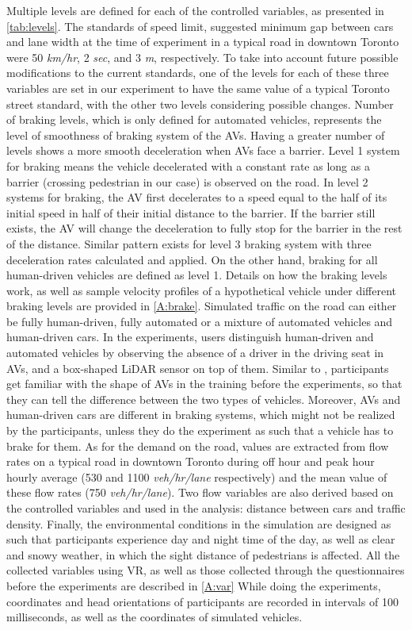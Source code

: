 Multiple levels are defined for each of the controlled variables, as presented in \cref{tab:levels}. The standards of speed limit, suggested minimum gap between cars and lane width at the time of experiment in a typical road in downtown Toronto were 50 \textit{km/hr}, 2 \textit{sec}, and 3 \textit{m}, respectively. To take into account future possible modifications to the current standards, one of the levels for each of these three variables are set in our experiment to have the same value of a typical Toronto street standard, with the other two levels considering possible changes. Number of braking levels, which is only defined for automated vehicles, represents the level of smoothness of braking system of the AVs. Having a greater number of levels shows a more smooth deceleration when AVs face a barrier. Level 1 system for braking means the vehicle decelerated with a constant rate as long as a barrier (crossing pedestrian in our case) is observed on the road. In level 2 systems for braking, the AV first decelerates to a speed equal to the half of its initial speed in half of their initial distance to the barrier. If the barrier still exists, the AV will change the deceleration to fully stop for the barrier in the rest of the distance. Similar pattern exists for level 3 braking system with three deceleration rates calculated and applied. On the other hand, braking for all human-driven vehicles are defined as level 1. Details on how the braking levels work, as well as sample velocity profiles of a hypothetical vehicle under different braking levels are provided in \cref{A:brake}. Simulated traffic on the road can either be fully human-driven, fully automated or a mixture of automated vehicles and human-driven cars. In the experiments, users distinguish human-driven and automated vehicles by observing the absence of a driver in the driving seat in AVs, and a box-shaped LiDAR sensor on top of them. Similar to \citep{jayaraman2019pedestrian}, participants get familiar with the shape of AVs in the training before the experiments, so that they can tell the difference between the two types of vehicles. Moreover, AVs and human-driven cars are different in braking systems, which might not be realized by the participants, unless they do the experiment as such that a vehicle has to brake for them. As for the demand on the road, values are extracted from flow rates on a typical road in downtown Toronto during off hour and peak hour hourly average (530 and 1100 \textit{veh/hr/lane} respectively) and the mean value of these flow rates (750 \textit{veh/hr/lane}). Two flow variables are also derived based on the controlled variables and used in the analysis: distance between cars and traffic density. Finally, the environmental conditions in the simulation are designed as such that participants experience day and night time of the day, as well as clear and snowy weather, in which the sight distance of pedestrians is affected. All the collected variables using VR, as well as those collected through the questionnaires before the experiments are described in \cref{A:var} While doing the experiments, coordinates and head orientations of participants are recorded in intervals of 100 milliseconds, as well as the coordinates of simulated vehicles. 

